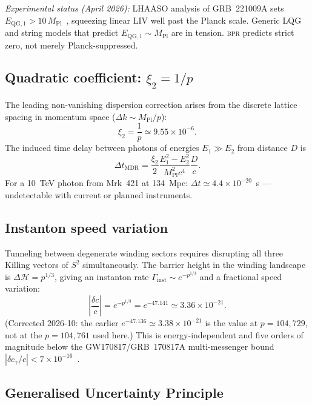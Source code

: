 \documentclass[aps,prd,twocolumn,superscriptaddress,longbibliography,nofootinbib]{revtex4-2}
\newcommand{\Stwo}{S^2}
\newcommand{\MPl}{M_{\mathrm{Pl}}}
\newcommand{\bpr}{\textsc{bpr}}
\newcommand{\abs}[1]{\left|#1\right|}
\begin{document}
\textit{Experimental status (April 2026):} LHAASO analysis of GRB~221009A
sets $E_{\mathrm{QG},1} > 10\,\MPl$~\cite{LHAASO2024}, squeezing linear LIV
well past the Planck scale.  Generic LQG and string models that predict
$E_{\mathrm{QG},1} \sim \MPl$ are in tension.  \bpr{} predicts strict zero,
not merely Planck-suppressed.

\subsection{Quadratic coefficient: $\xi_2 = 1/p$}

The leading non-vanishing dispersion correction arises from the discrete
lattice spacing in momentum space ($\Delta k \sim \MPl/p$):
\begin{equation}
\xi_2 = \frac{1}{p} \simeq 9.55 \times 10^{-6}.
\label{eq:xi2}
\end{equation}
The induced time delay between photons of energies $E_1 \gg E_2$ from
distance $D$ is
\begin{equation}
\Delta t_{\mathrm{MDR}} = \frac{\xi_2}{2}
  \frac{E_1^2 - E_2^2}{\MPl^2 c^4}\frac{D}{c}.
\end{equation}
For a 10~TeV photon from Mrk~421 at 134~Mpc: $\Delta t \simeq 4.4\times10^{-20}$~s
--- undetectable with current or planned instruments.

\subsection{Instanton speed variation}

Tunneling between degenerate winding sectors requires disrupting all three
Killing vectors of $\Stwo$ simultaneously.  The barrier height in the winding
landscape is $\Delta\mathcal{H} = p^{1/3}$, giving an instanton rate
$\Gamma_{\mathrm{inst}} \sim e^{-p^{1/3}}$ and a fractional speed variation:
\begin{equation}
\abs{\frac{\delta c}{c}} = e^{-p^{1/3}} = e^{-47.141}
  \simeq 3.36 \times 10^{-21}.
\label{eq:deltac}
\end{equation}
(Corrected 2026-10: the earlier $e^{-47.136} \simeq 3.38\times10^{-21}$
is the value at $p = 104{,}729$, not at the $p = 104{,}761$ used here.)
This is energy-independent and five orders of magnitude below the
GW170817/GRB~170817A multi-messenger bound
$|\delta c_\gamma / c| < 7\times10^{-16}$~\cite{Abbott2017}.

\subsection{Generalised Uncertainty Principle}
\end{document}

